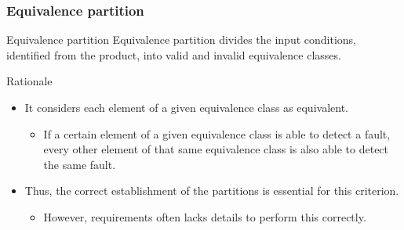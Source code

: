 \begin{frame}[ parent={concept:functional-testing}, hasprev=false, hasnext=true]
\frametitle{Equivalence partition}
\label{concept:equivalence-partition}

\begin{block:concept}{Equivalence partition}
Equivalence partition divides the input conditions, identified from the
product, into valid and invalid equivalence classes.
\end{block:concept}

\begin{block:fact}{Rationale}
\begin{itemize}
	\item It considers each element of a given equivalence class as equivalent.
	\begin{itemize}
		\item If a certain element of a given equivalence class is able to
		detect a fault, every other element of that same equivalence class
		is also able to detect the same fault.
	\end{itemize}

	\item Thus, the correct establishment of the partitions is essential for
	this criterion.
	\begin{itemize}
		\item However, requirements often lacks details to perform this
		correctly.
	\end{itemize}
\end{itemize}
\end{block:fact}
\end{frame}



